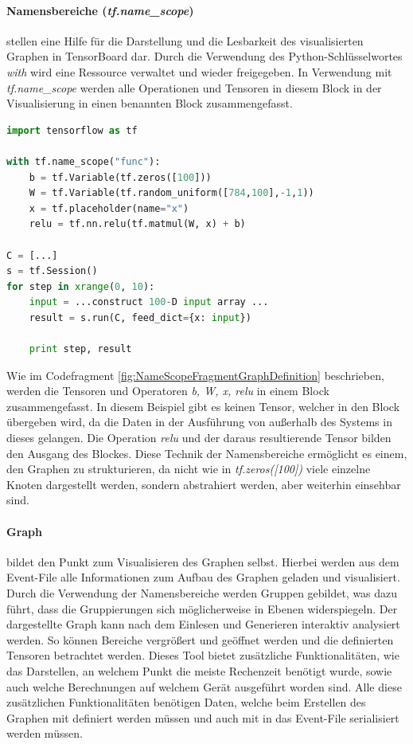 \paragraph{Namensbereiche (\textit{tf.name\_scope})} stellen eine Hilfe für die Darstellung und die Lesbarkeit des visualisierten Graphen in TensorBoard dar. 
Durch die Verwendung des Python-Schlüsselwortes \textit{with} wird eine Ressource verwaltet und wieder freigegeben. 
In Verwendung mit \textit{tf.name\_scope} werden alle Operationen und Tensoren in diesem Block in der Visualisierung in einen benannten Block zusammengefasst.
\begin{lstlisting}[caption={TensorFlow Codefragment zur Namescope Verwendung in Graphen},label=fig:NameScopeFragmentGraphDefinition,captionpos=b,language=Python]
import tensorflow as tf

with tf.name_scope("func"):
	b = tf.Variable(tf.zeros([100])) 
	W = tf.Variable(tf.random_uniform([784,100],-1,1)) 
	x = tf.placeholder(name="x") 
	relu = tf.nn.relu(tf.matmul(W, x) + b) 

C = [...] 
s = tf.Session()
for step in xrange(0, 10):
	input = ...construct 100-D input array ... 
	result = s.run(C, feed_dict={x: input}) 

	print step, result 
\end{lstlisting}
Wie im Codefragment \ref{fig:NameScopeFragmentGraphDefinition} beschrieben, werden die Tensoren und Operatoren \textit{b, W, x, relu} in einem Block zusammengefasst. 
In diesem Beispiel gibt es keinen Tensor, welcher in den Block übergeben wird, da die Daten in der Ausführung von außerhalb des Systems in dieses gelangen. 
Die Operation \textit{relu} und der daraus resultierende Tensor bilden den Ausgang des Blockes. 
Diese Technik der Namensbereiche ermöglicht es einem, den Graphen zu strukturieren, da nicht wie in \textit{tf.zeros([100])} viele einzelne Knoten dargestellt werden, sondern abstrahiert werden, aber weiterhin einsehbar sind.

\paragraph{Graph} bildet den Punkt zum Visualisieren des Graphen selbst. 
Hierbei werden aus dem Event-File alle Informationen zum Aufbau des Graphen geladen und visualisiert. 
Durch die Verwendung der Namensbereiche werden Gruppen gebildet, was dazu führt, dass die Gruppierungen sich möglicherweise in Ebenen widerspiegeln. 
Der dargestellte Graph kann nach dem Einlesen und Generieren interaktiv analysiert werden. 
So können Bereiche vergrößert und geöffnet werden und die definierten Tensoren betrachtet werden. 
Dieses Tool bietet zusätzliche Funktionalitäten, wie das Darstellen, an welchem Punkt die meiste Rechenzeit benötigt wurde, sowie auch welche Berechnungen auf welchem Gerät ausgeführt worden sind. 
Alle diese zusätzlichen Funktionalitäten benötigen Daten, welche beim Erstellen des Graphen mit definiert werden müssen und auch mit in das Event-File serialisiert werden müssen. 

